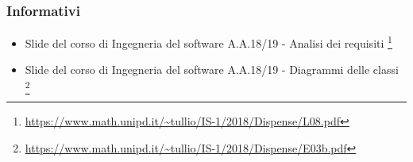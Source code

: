 	\subsubsection{Informativi}
	\begin{itemize}
		\item Slide del corso di Ingegneria del software A.A.18/19 - Analisi dei requisiti \footnote{\url{https://www.math.unipd.it/~tullio/IS-1/2018/Dispense/L08.pdf}}
		\item Slide del corso di Ingegneria del software A.A.18/19 - Diagrammi delle classi \footnote{\url{https://www.math.unipd.it/~tullio/IS-1/2018/Dispense/E03b.pdf}}
	\end{itemize}
		